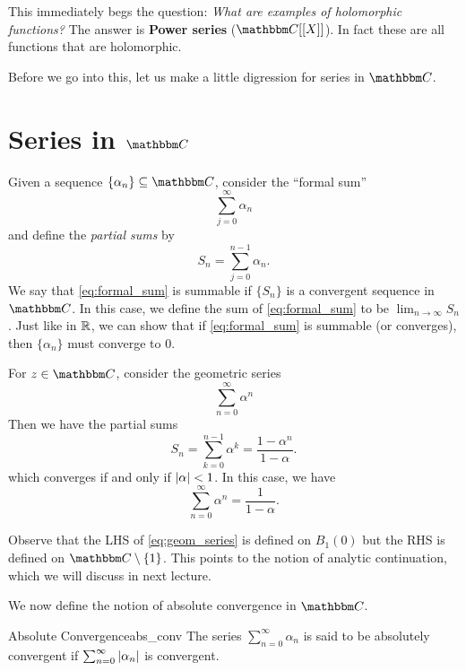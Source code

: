 \documentclass[../ComplexAnalysis_Notes.tex]{subfiles}
\begin{document}
\smallskip

This immediately begs the question: \textit{What are examples of holomorphic functions?} The answer is \textbf{Power series} (\(\C[[X]]\)). In fact these are all functions that are holomorphic.

\smallskip

Before we go into this, let us make a little digression for series in \(\C\).

\section{Series in \texorpdfstring{\(\C\)}{C}}

Given a sequence \(\{\alpha_n\} \subseteq \C\), consider the ``formal sum''
\begin{equation}\label{eq:formal_sum}
  \sum_{j = 0}^{\infty} \alpha_n
\end{equation}
and define the \textit{partial sums} by
\[
  S_n = \sum_{j = 0}^{n - 1} \alpha_n.
\]
We say that \eqref{eq:formal_sum} is summable if \(\{S_n\}\) is a convergent sequence in \(\C\). In this case, we define the sum of \eqref{eq:formal_sum} to be \(\lim_{n \to \infty} S_n\). Just like in \(\mathbb{R}\), we can show that if \eqref{eq:formal_sum} is summable (or converges), then \(\{\alpha_n\}\) must converge to \(0\).

\begin{Eg}{}{}
  For \(z \in \C\), consider the geometric series
  \[ \sum_{n = 0}^{\infty} \alpha^n \]
  Then we have the partial sums
  \[
    S_n = \sum_{k = 0}^{n - 1} \alpha^k = \frac{1 - \alpha^n}{1 - \alpha}.
  \]
  which converges if and only if \(\abs{\alpha} < 1\). In this case, we have
  \begin{equation}\label{eq:geom_series}
    \sum_{n = 0}^{\infty} \alpha^n = \frac{1}{1 - \alpha}.
  \end{equation}
\end{Eg}

Observe that the LHS of \eqref{eq:geom_series} is defined on \(B_1(0)\) but the RHS is defined on \(\C \setminus \{1\}\). This points to the notion of analytic continuation, which we will discuss in next lecture.

We now define the notion of absolute convergence in \(\C\).

\begin{Def}{Absolute Convergence}{abs_conv}
  The series \(\sum_{n = 0}^{\infty} \alpha_n\) is said to be absolutely convergent if \(\sum_{n = 0}^{\infty} \abs{\alpha_n}\) is convergent.
\end{Def}
\end{document}
